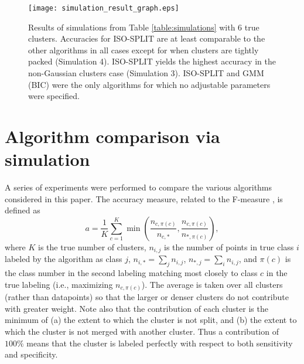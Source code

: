 \documentclass[10pt]{article}
\begin{document}
\begin{figure}
\begin{center}
\texttt{[image: simulation\_result\_graph.eps]}
\end{center}
\caption{
Results of simulations from Table \ref{table:simulations} with $6$ true clusters. Accuracies for ISO-SPLIT are at least comparable to the other algorithms in all cases except for when clusters are tightly packed (Simulation 4). ISO-SPLIT yields the highest accuracy in the non-Gaussian clusters case (Simulation 3). ISO-SPLIT and GMM (BIC) were the only algorithms for which no adjustable parameters were specified.
}
\label{fig:result_bars}
\end{figure}

\section {Algorithm comparison via simulation}
\label{algorithm_comparison}

A series of experiments were performed to compare the various algorithms considered in this paper. The accuracy measure, related to the F-measure \cite[Ch.~17]{zaki-book}, is defined as 
$$a=\frac{1}{K}\sum_{c=1}^K \min\left(\frac{n_{c,\pi(c)}}{n_{c,*}},\frac{n_{c,\pi(c)}}{n_{*,\pi(c)}}\right),$$
where $K$ is the true number of clusters, $n_{i,j}$ is the number of points in true class $i$ labeled by the algorithm as class $j$, $n_{i,*}=\sum_j n_{i,j}$, $n_{*,j}=\sum_i n_{i,j}$, and $\pi(c)$ is the class number in the second labeling matching most closely to class $c$ in the true labeling (i.e., maximizing $n_{c,\pi(c)}$).
The average is taken over all clusters (rather than datapoints) so that the larger or denser clusters do not contribute with greater weight. Note also that the contribution of each cluster is the minimum of (a) the extent to which the cluster is not split, and (b) the extent to which the cluster is not merged with another cluster. Thus a contribution of $100\%$ means that the cluster is labeled perfectly with respect to both sensitivity and specificity.
\end{document}
